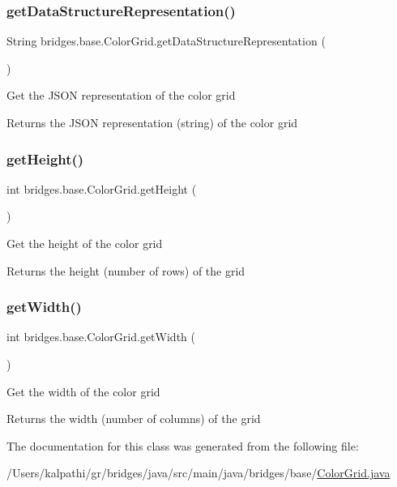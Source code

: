 \subsubsection{\texorpdfstring{getDataStructureRepresentation()}{getDataStructureRepresentation()}}
{\footnotesize\ttfamily String bridges.\+base.\+Color\+Grid.\+get\+Data\+Structure\+Representation (\begin{DoxyParamCaption}{ }\end{DoxyParamCaption})}

Get the J\+S\+ON representation of the color grid

\begin{DoxyReturn}{Returns}
the J\+S\+ON representation (string) of the color grid 
\end{DoxyReturn}
\mbox{\label{classbridges_1_1base_1_1_color_grid_a8793791e35f03b3e5a2e5ef3606ac124}} 
\subsubsection{\texorpdfstring{getHeight()}{getHeight()}}
{\footnotesize\ttfamily int bridges.\+base.\+Color\+Grid.\+get\+Height (\begin{DoxyParamCaption}{ }\end{DoxyParamCaption})}

Get the height of the color grid

\begin{DoxyReturn}{Returns}
the height (number of rows) of the grid 
\end{DoxyReturn}
\mbox{\label{classbridges_1_1base_1_1_color_grid_af872226de86ac8e8f2553fdc5bddc375}} 
\subsubsection{\texorpdfstring{getWidth()}{getWidth()}}
{\footnotesize\ttfamily int bridges.\+base.\+Color\+Grid.\+get\+Width (\begin{DoxyParamCaption}{ }\end{DoxyParamCaption})}

Get the width of the color grid

\begin{DoxyReturn}{Returns}
the width (number of columns) of the grid 
\end{DoxyReturn}


The documentation for this class was generated from the following file\+:\begin{DoxyCompactItemize}
\item 
/\+Users/kalpathi/gr/bridges/java/src/main/java/bridges/base/\mbox{\hyperlink{_color_grid_8java}{Color\+Grid.\+java}}\end{DoxyCompactItemize}
